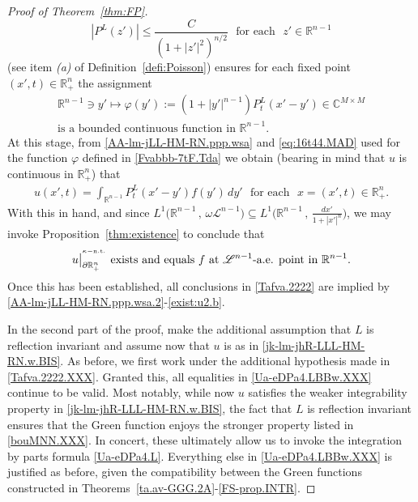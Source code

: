 \documentclass[11pt,reqno]{amsart}
\numberwithin{equation}{section}
\theoremstyle{remark}
\begin{document}
\begin{proof}[Proof of Theorem~\ref{thm:FP}]
\begin{equation}
|P^L(z')|\leq\frac{C}{(1+|z'|^2)^{n/2}}\,\,\text{ for each }\,\,z'\in{\mathbb{R}}^{n-1}
\end{equation}
%
(see item {\it (a)} of Definition~\ref{defi:Poisson}) 
ensures for each fixed point $(x',t)\in{\mathbb{R}}^n_{+}$ the assignment 
%
\begin{equation}\label{Fvabbb-7tF.Tda}
\begin{array}{c}
\displaystyle
{\mathbb{R}}^{n-1}\ni y'\mapsto\varphi(y'):=(1+|y'|^{n-1})P^L_t(x'-y')\in{\mathbb{C}}^{M\times M}
\\[6pt]
\text{is a bounded continuous function in ${\mathbb{R}}^{n-1}$}.
\end{array}
\end{equation}
%
At this stage, from \eqref{AA-lm-jLL-HM-RN.ppp.wsa} and \eqref{eq:16t44.MAD} 
used for the function $\varphi$ defined in \eqref{Fvabbb-7tF.Tda} we obtain 
(bearing in mind that $u$ is continuous in ${\mathbb{R}}^n_{+}$) that 
%
\begin{align}\label{AA-lm-jLL-HM-RN.ppp.wsa.2}
u(x',t)=\int_{{\mathbb{R}}^{n-1}}P^L_t(x'-y')f(y')\,dy'\,\,\text{ for each }\,\,x=(x',t)\in{\mathbb{R}}^n_{+}.
\end{align}
%
With this in hand, and since $L^1\big({\mathbb{R}}^{n-1}\,,\,\omega{\mathscr{L}}^{n-1}\big)
\subseteq L^1\Big({\mathbb{R}}^{n-1}\,,\,\displaystyle\frac{dx'}{1+|x'|^{n}}\Big)$, we may invoke 
Proposition~\ref{thm:existence} to conclude that
%
\begin{equation}\label{exist:u2.b}
\text{$u\big|^{{}^{\kappa-{\rm n.t.}}}_{\partial\mathbb{R}^{n}_{+}}$ exists and equals $f$ 
at ${\mathscr{L}}^{n-1}$-a.e. point in $\mathbb{R}^{n-1}$}.
\end{equation}
%
Once this has been established, all conclusions in \eqref{Tafva.2222} are implied by 
\eqref{AA-lm-jLL-HM-RN.ppp.wsa.2}-\eqref{exist:u2.b}. 

In the second part of the proof, make the additional assumption that $L$ is reflection invariant  
and assume now that $u$ is as in \eqref{jk-lm-jhR-LLL-HM-RN.w.BIS}. As before, we first work under 
the additional hypothesis made in \eqref{Tafva.2222.XXX}. Granted this, all equalities in \eqref{Ua-eDPa4.LBBw.XXX}
continue to be valid. Most notably, while now $u$ satisfies the weaker integrability property in 
\eqref{jk-lm-jhR-LLL-HM-RN.w.BIS}, the fact that $L$ is reflection invariant ensures that the Green function 
enjoys the stronger property listed in \eqref{bouMNN.XXX}. In concert, these ultimately allow us to invoke 
the integration by parts formula \eqref{Ua-eDPa4.L}. Everything else in \eqref{Ua-eDPa4.LBBw.XXX} is justified as before, 
given the compatibility between the Green functions constructed in Theorems~\ref{ta.av-GGG.2A}-\ref{FS-prop.INTR}.


\end{proof}
\end{document}
